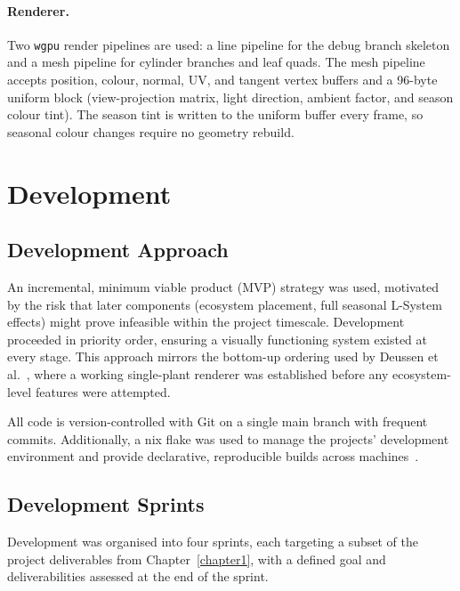 \paragraph{Renderer.}
Two \texttt{wgpu} render pipelines are used: a line pipeline for the debug branch skeleton and a mesh
pipeline for cylinder branches and leaf quads. The mesh pipeline accepts position, colour, normal, UV, and
tangent vertex buffers and a 96-byte uniform block (view-projection matrix, light direction, ambient factor,
and season colour tint). The season tint is written to the uniform buffer every frame, so seasonal colour
changes require no geometry rebuild.

\section{Development}

\subsection{Development Approach}

An incremental, minimum viable product (MVP) strategy was used, motivated by the risk that later components
(ecosystem placement, full seasonal L-System effects) might prove infeasible within the project timescale.
Development proceeded in priority order, ensuring a visually functioning system existed at every stage. This
approach mirrors the bottom-up ordering used by Deussen et al.~\cite{deussenRealisticModelingRendering1998},
where a working single-plant renderer was established before any ecosystem-level features were attempted.

\medskip
All code is version-controlled with Git on a single main branch with frequent commits. Additionally, a nix
flake was used to manage the projects' development environment and provide declarative, reproducible builds
across machines~\cite{dolstraPurelyFunctionalSoftware2006, nixManual}.

\subsection{Development Sprints}

Development was organised into four sprints, each targeting a subset of the project deliverables from
Chapter~\ref{chapter1}, with a defined goal and deliverabilities assessed at the end of the sprint.

